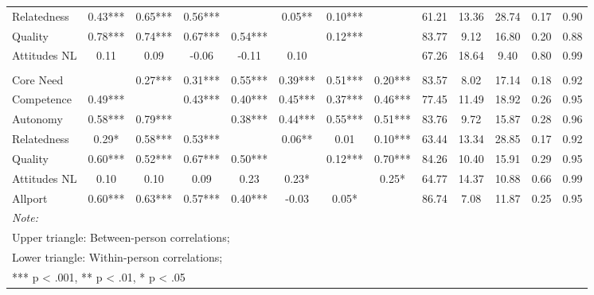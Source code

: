 \begin{table}
\begin{minipage}[t][\textheight][t]{\textwidth}
{\begin{tabular}[t]{lcccccccccccc}
\hspace{1em}Relatedness & 0.43*** & 0.65*** & 0.56*** &  & 0.05** & 0.10*** &  & 61.21 & 13.36 & 28.74 & 0.17 & 0.90\\
\hspace{1em}Quality & 0.78*** & 0.74*** & 0.67*** & 0.54*** &  & 0.12*** &  & 83.77 & 9.12 & 16.80 & 0.20 & 0.88\\
\hspace{1em}Attitudes NL & 0.11 & 0.09 & -0.06 & -0.11 & 0.10 &  &  & 67.26 & 18.64 & 9.40 & 0.80 & 0.99\\
\addlinespace[0.3em]
\multicolumn{13}{l}{\textbf{Study 3}}\\
\hspace{1em}Core Need &  & 0.27*** & 0.31*** & 0.55*** & 0.39*** & 0.51*** & 0.20*** & 83.57 & 8.02 & 17.14 & 0.18 & 0.92\\
\hspace{1em}Competence & 0.49*** &  & 0.43*** & 0.40*** & 0.45*** & 0.37*** & 0.46*** & 77.45 & 11.49 & 18.92 & 0.26 & 0.95\\
\hspace{1em}Autonomy & 0.58*** & 0.79*** &  & 0.38*** & 0.44*** & 0.55*** & 0.51*** & 83.76 & 9.72 & 15.87 & 0.28 & 0.96\\
\hspace{1em}Relatedness & 0.29* & 0.58*** & 0.53*** &  & 0.06** & 0.01 & 0.10*** & 63.44 & 13.34 & 28.85 & 0.17 & 0.92\\
\hspace{1em}Quality & 0.60*** & 0.52*** & 0.67*** & 0.50*** &  & 0.12*** & 0.70*** & 84.26 & 10.40 & 15.91 & 0.29 & 0.95\\
\hspace{1em}Attitudes NL & 0.10 & 0.10 & 0.09 & 0.23 & 0.23* &  & 0.25* & 64.77 & 14.37 & 10.88 & 0.66 & 0.99\\
\hspace{1em}Allport & 0.60*** & 0.63*** & 0.57*** & 0.40*** & -0.03 & 0.05* &  & 86.74 & 7.08 & 11.87 & 0.25 & 0.95\\
\bottomrule
\multicolumn{13}{l}{\rule{0pt}{1em}\textit{Note: }}\\
\multicolumn{13}{l}{\rule{0pt}{1em}Upper triangle: Between-person correlations;}\\
\multicolumn{13}{l}{\rule{0pt}{1em}Lower triangle: Within-person correlations;}\\
\multicolumn{13}{l}{\rule{0pt}{1em}*** p < .001, ** p < .01,  * p < .05}\\
\end{tabular}}
\end{minipage}
\end{table}
